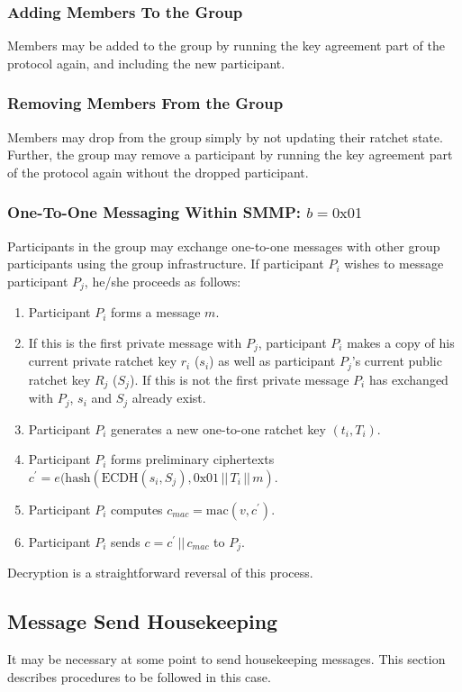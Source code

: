 \documentclass[%
preprint,
amsmath,amssymb,
aps,
prb,
floatfix,
]{revtex4-1}
\begin{document}
\subsubsection{\label{sec:additions}Adding Members To the Group}

Members may be added to the group by running the key agreement part of the
protocol again, and including the new participant.

\subsubsection{\label{sec:removal}Removing Members From the Group}

Members may drop from the group simply by not updating their ratchet state.
Further, the group may remove a participant by running the key agreement part of the
protocol again without the dropped participant.

\subsubsection{\label{sec:im}One-To-One Messaging Within SMMP: $b =
0\mathrm{x}01$}
Participants in the group may exchange one-to-one messages with other group
participants using the group infrastructure. If participant $P_i$ wishes to
message participant $P_j$, he/she proceeds as follows:
\begin{enumerate}
\item Participant $P_i$ forms a message $m$.
\item If this is the first private message with $P_j$, participant $P_i$ makes
a copy of his current private ratchet key $r_i$
($s_i$) as well as participant $P_j$'s current public ratchet key $R_j$ ($S_j$).
If this is not the first private message $P_i$ has exchanged with $P_j$,
$s_i$ and $S_j$ already exist.
\item Participant $P_i$ generates a new one-to-one ratchet key $(t_i, T_i)$.
\item Participant $P_i$ forms preliminary ciphertexts $c^\prime =
e(\mathrm{hash}(\mathrm{ECDH}(s_i, S_j), 0\mathrm{x}01
\, || \, T_i \, || \, m)$.
\item Participant $P_i$ computes $c_{mac} = \mathrm{mac}(v, c^\prime)$.
\item Participant $P_i$ sends $c = c^\prime \, || \, c_{mac}$ to $P_j$.
\end{enumerate}
Decryption is a straightforward reversal of this process.

\subsection{\label{sec:sendhousekeeping}Message Send Housekeeping}
It may be necessary at some point to send housekeeping messages. This section
describes procedures to be followed in this case.
\end{document}
